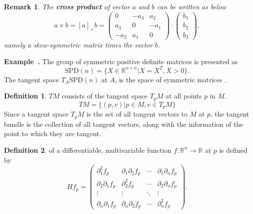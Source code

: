 \documentclass[a4paper]{article}
\theoremstyle{definition}
\newtheorem{definition}{Definition}
\theoremstyle{plain}
\newtheorem{remark}{Remark}
\newcounter{example}{Example}
\newenvironment{example}[1][]{\refstepcounter{example}\par\medskip
   \noindent \textbf{Example~\theexample. #1} \rmfamily}{\medskip}
\begin{document}
\begin{remark}
The \textbf{cross product} of vector $a$ and $b$ can be written as below
\begin{equation*}
    a\times b=[a]_\times b=
    \begin{pmatrix}
        0 & -a_3 & a_2\\
        a_3 & 0 & -a_1\\
        -a_2 & a_1 & 0
    \end{pmatrix}\cdot
    \begin{pmatrix}
        b_1\\
        b_2\\
        b_3
    \end{pmatrix},
\end{equation*}
namely a skew-symmetric matrix times the vector $b$.
\end{remark}

\begin{example}
The group of symmetric positive definite matrices is presented as
\begin{equation*}
    \mathrm{SPD}(n)=\{X\in \mathbb{R}^{n×n}|X=X^T,X>0\}.
\end{equation*}
The tangent space $T_A\mathrm{SPD}(n)$ at $A$, is the space of symmetric matrices \cite{yger}.
\end{example}

\begin{definition}
 $TM$ consists of the tangent space $T_pM$ at all points $p$ in $M$. 
\begin{equation*}
     TM=\{(p,v)|p \in M,v \in T_pM\} 
\end{equation*}
Since a tangent space $T_pM$ is the set of all tangent vectors to $M$ at $p$, the tangent bundle is the collection of all tangent vectors, along with the information of the point to which they are tangent.
\end{definition}

\begin{definition}
 of a differentiable, multivariable function $f:\mathbb{R}^n\rightarrow\mathbb{R}$ at $p$ is defined by
\begin{equation*}
    Hf_p=
    \begin{pmatrix}
    \partial^2_1f_p & \partial_1\partial_2f_p & \cdots & \partial_1\partial_nf_p\\
    \partial_2\partial_1f_p & \partial^2_2f_p & \cdots & \partial_2\partial_nf_p\\
    \vdots & \vdots & \ddots & \vdots\\
    \partial_n\partial_1f_p & \partial_n\partial_2f_p & \cdots & \partial^2_nf_p
    \end{pmatrix}.
\end{equation*}
\end{definition}
\end{document}
